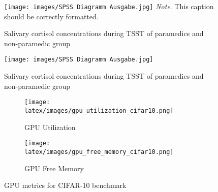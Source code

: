 \begin{figure}[H]
    \caption{Salivary cortisol concentrations during \ac{TSST} of paramedics and non-paramedic group} \label{fig:cortisol.concentraition}
    \texttt{[image: images/SPSS Diagramm Ausgabe.jpg]}
    \small\textit{Note}. This caption should be correctly formatted.
\end{figure}

\begin{figure}[H]
    \texttt{[image: images/SPSS Diagramm Ausgabe.jpg]}
    \caption{Salivary cortisol concentrations during \ac{TSST} of paramedics and non-paramedic group} \label{fig:cortisol.concentraition}
\end{figure} %

\begin{figure}[H]
    {\centering
        \begin{subfigure}{0.45\textwidth}
            \texttt{[image: latex/images/gpu\_utilization\_cifar10.png]}
            \caption{GPU Utilization}
            \label{fig:gpuUtilization}
        \end{subfigure}
        \hfill
        \begin{subfigure}{0.45\textwidth}
            \texttt{[image: latex/images/gpu\_free\_memory\_cifar10.png]}
            \caption{GPU Free Memory}
            \label{fig:gpuFreeMemory}
        \end{subfigure}
    }
    \caption{GPU metrics for \acs{CIFAR}-10 benchmark} \label{fig:cifar10Gpu}
\end{figure} %

